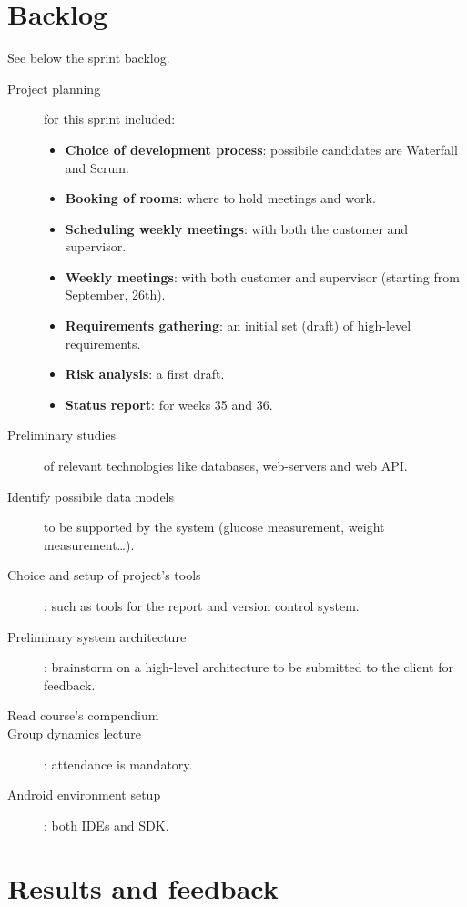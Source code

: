 \section{Backlog}

See below the sprint backlog.
\begin{description}
	\item[Project planning]
		for this sprint included:
		\begin{itemize}
			\item \textbf{Choice of development process}:
				possibile candidates are Waterfall and Scrum.
			\item \textbf{Booking of rooms}:
				where to hold meetings and work.
			\item \textbf{Scheduling weekly meetings}:
				with both the customer and supervisor.
			\item \textbf{Weekly meetings}:
				with both customer and supervisor (starting from September, 26th).
			\item \textbf{Requirements gathering}:
				an initial set (draft) of high-level requirements.
			\item \textbf{Risk analysis}:
				a first draft.
			\item \textbf{Status report}:
				for weeks 35 and 36.
		\end{itemize}
	\item[Preliminary studies]
		of relevant technologies like databases, web-servers and web API.
	\item[Identify possibile data models]
		to be supported by the system (glucose measurement, weight measurement\ldots).
	\item[Choice and setup of project's tools]:
		such as tools for the report and version control system.
	\item[Preliminary system architecture]:
		brainstorm on a high-level architecture to be submitted to the client for feedback.
	\item[Read course's compendium]
	\item[Group dynamics lecture]:
		attendance is mandatory.
	\item[Android environment setup]:
		both IDEs and SDK.
\end{description}


\section{Results and feedback}

